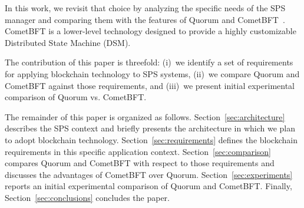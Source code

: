 In this work, we revisit that choice by analyzing the specific needs of the SPS manager and comparing them with the features of Quorum and CometBFT~\cite{cometbft}.  
CometBFT is a lower-level technology designed to provide a highly customizable Distributed State Machine (DSM).

The contribution of this paper is threefold:  
(i)~we identify a set of requirements for applying blockchain technology to SPS systems,  
(ii)~we compare Quorum and CometBFT against those requirements, and  
(iii)~we present initial experimental comparison of Quorum vs. CometBFT.

The remainder of this paper is organized as follows.  
Section~\ref{sec:architecture} describes the SPS context and briefly presents the architecture in which we plan to adopt blockchain technology.  
Section~\ref{sec:requirements} defines the blockchain requirements in this specific application context.  
Section~\ref{sec:comparison} compares Quorum and CometBFT with respect to those requirements and discusses the advantages of CometBFT over Quorum.  
Section~\ref{sec:experiments} reports an initial experimental comparison of Quorum and CometBFT.
Finally, Section~\ref{sec:conclusions} concludes the paper.





